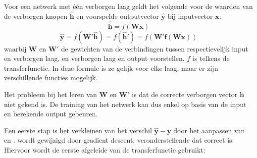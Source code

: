 Voor een netwerk met \'e\'en verborgen laag geldt het volgende voor de waarden van de verborgen knopen $\mathbf{\hat{h}}$ en voorspelde outputvector $\mathbf{\hat{y}}$ bij inputvector $\mathbf{x}$:
\begin{equation}
    \mathbf{\hat{h}} = f(\mathbf{Wx})
\end{equation}
\begin{equation}
    \boldsymbol{\hat{y}} = f(\boldsymbol{W'\hat{h}}) = f(\boldsymbol{\hat{h}'}) = f(\boldsymbol{W'f(\boldsymbol{Wx})})
\end{equation}
waarbij $\mathbf{W}$ en $\mathbf{W'}$ de gewichten van de verbindingen tussen respectievelijk input en verborgen laag, en verborgen laag en output voorstellen. $f$ is telkens de transferfunctie. In deze formule is ze gelijk voor elke laag, maar er zijn verschillende functies mogelijk.

Het probleem bij het leren van $\mathbf{W}$ en $\mathbf{W'}$ is dat de correcte verborgen vector $\mathbf{h}$ niet gekend is. De training van het netwerk kan dus enkel op basis van de input en berekende output gebeuren.

Een eerste stap is het verkleinen van het verschil $\mathbf{\hat{y}} - \mathbf{y}$ door het aanpassen van  en .  wordt gewijzigd door gradient descent, veronderstellende dat  correct is. Hiervoor wordt de eerste afgeleide van de transferfunctie gebruikt:

